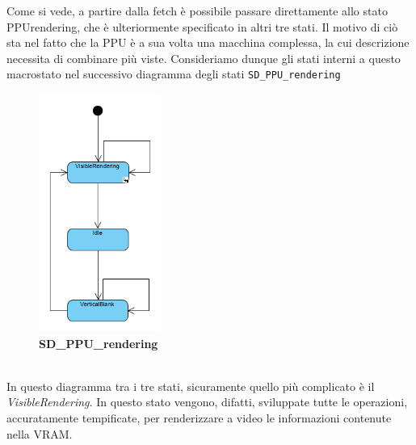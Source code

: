 \documentclass[11pt]{article}
\begin{document}
\clearpage
Come si vede, a partire dalla fetch è possibile passare direttamente allo stato PPUrendering, che è ulteriormente specificato in altri tre stati. Il motivo di ciò sta nel fatto che la PPU è a sua volta una macchina complessa, la cui descrizione necessita di combinare più viste. Consideriamo dunque gli stati interni a questo macrostato nel successivo diagramma degli stati \texttt{SD\_PPU\_rendering}
\begin{figure}[h]
\centering
\includegraphics[width=150px, height=295px]{SD_PPU_rendering.png}\\
\small\textbf{SD\_PPU\_rendering}
\end{figure}\\
In questo diagramma tra i tre stati, sicuramente quello più complicato è il \emph{VisibleRendering}. In questo stato vengono, difatti, sviluppate tutte le operazioni, accuratamente tempificate, per renderizzare a video le informazioni contenute nella VRAM.
\clearpage
\end{document}
